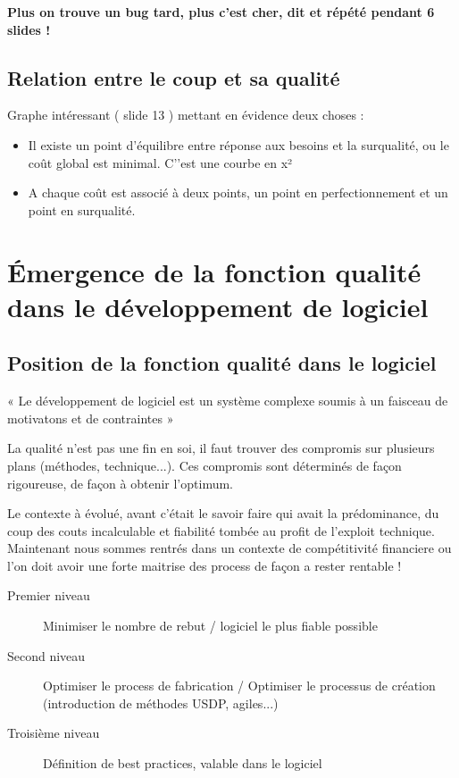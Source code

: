 \textbf{Plus on trouve un bug  tard, plus c’est cher, dit et répété pendant 6 slides !}

	\subsection{Relation entre le coup et sa qualité}

	Graphe intéressant ( slide 13 ) mettant en évidence deux choses :

	\begin{itemize}
    \item Il existe un point d'équilibre entre réponse aux besoins et la surqualité, ou le coût global est minimal. C’’est une courbe en x²
    \item A chaque coût est associé à deux points, un point en perfectionnement et un point en surqualité.
	\end{itemize}



\section{Émergence de la fonction qualité dans le développement de logiciel}

	\subsection{Position de la fonction qualité dans le logiciel}

    « Le développement de logiciel est un système complexe soumis à un faisceau de motivatons et de contraintes »

La qualité n’est pas une fin en soi, il faut trouver des compromis sur plusieurs plans (méthodes, technique...). Ces compromis sont déterminés de façon rigoureuse, de façon à obtenir l’optimum.

Le contexte à évolué, avant c’était le savoir faire qui avait la prédominance, du coup des couts incalculable et fiabilité tombée au profit de l’exploit technique. Maintenant nous sommes rentrés dans un contexte de compétitivité financiere ou l’on doit avoir une forte maitrise des process de façon a rester rentable !

	
	\begin{description}
	\item[Premier niveau] Minimiser le nombre de rebut  / logiciel le plus fiable possible
	\item[Second niveau] Optimiser le process de fabrication  / Optimiser le processus de création (introduction de méthodes USDP, agiles...)
	\item[Troisième niveau]Définition de best practices, valable dans le logiciel
	\end{description}


